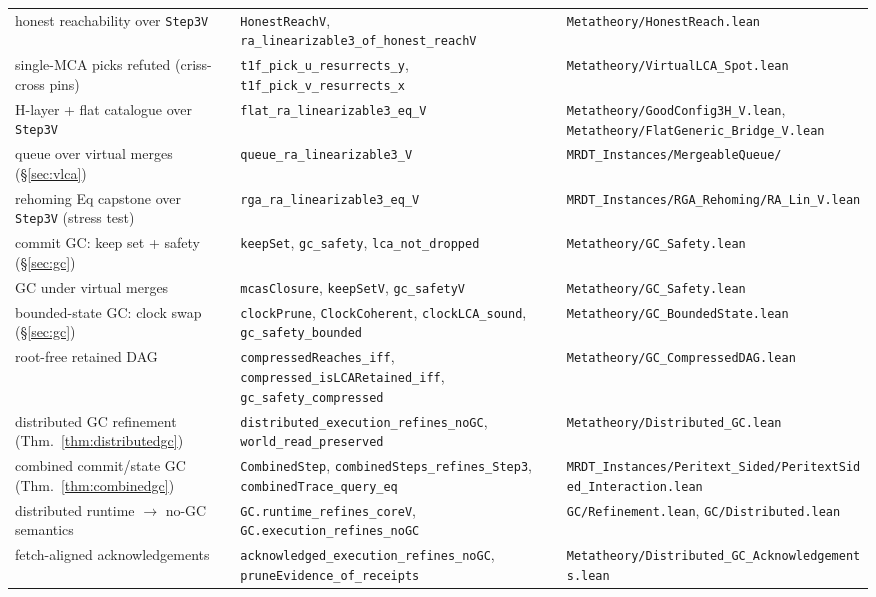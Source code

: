 \documentclass[11pt]{article}
\newcommand{\lean}[1]{\texttt{#1}}
\begin{document}
\begin{center}
{\begin{tabular}{@{}lll@{}}
honest reachability over \lean{Step3V} & \lean{HonestReachV}, \lean{ra\_linearizable3\_of\_honest\_reachV} & \lean{Metatheory/HonestReach.lean} \\
single-MCA picks refuted (criss-cross pins) & \lean{t1f\_pick\_u\_resurrects\_y}, \lean{t1f\_pick\_v\_resurrects\_x} & \lean{Metatheory/VirtualLCA\_Spot.lean} \\
H-layer + flat catalogue over \lean{Step3V} & \lean{flat\_ra\_linearizable3\_eq\_V} & \lean{Metatheory/GoodConfig3H\_V.lean}, \lean{Metatheory/FlatGeneric\_Bridge\_V.lean} \\
queue over virtual merges (\S\ref{sec:vlca}) & \lean{queue\_ra\_linearizable3\_V} & \lean{MRDT\_Instances/MergeableQueue/} \\
rehoming Eq capstone over \lean{Step3V} (stress test) & \lean{rga\_ra\_linearizable3\_eq\_V} & \lean{MRDT\_Instances/RGA\_Rehoming/RA\_Lin\_V.lean} \\
commit GC: keep set + safety (\S\ref{sec:gc}) & \lean{keepSet}, \lean{gc\_safety}, \lean{lca\_not\_dropped} & \lean{Metatheory/GC\_Safety.lean} \\
GC under virtual merges & \lean{mcasClosure}, \lean{keepSetV}, \lean{gc\_safetyV} & \lean{Metatheory/GC\_Safety.lean} \\
bounded-state GC: clock swap (\S\ref{sec:gc}) & \lean{clockPrune}, \lean{ClockCoherent}, \lean{clockLCA\_sound}, \lean{gc\_safety\_bounded} & \lean{Metatheory/GC\_BoundedState.lean} \\
root-free retained DAG & \lean{compressedReaches\_iff}, \lean{compressed\_isLCARetained\_iff}, \lean{gc\_safety\_compressed} & \lean{Metatheory/GC\_CompressedDAG.lean} \\
distributed GC refinement (Thm.~\ref{thm:distributedgc}) & \lean{distributed\_execution\_refines\_noGC}, \lean{world\_read\_preserved} & \lean{Metatheory/Distributed\_GC.lean} \\
combined commit/state GC (Thm.~\ref{thm:combinedgc}) & \lean{CombinedStep}, \lean{combinedSteps\_refines\_Step3}, \lean{combinedTrace\_query\_eq} & \lean{MRDT\_Instances/Peritext\_Sided/PeritextSided\_Interaction.lean} \\
distributed runtime $\to$ no-GC semantics & \lean{GC.runtime\_refines\_coreV}, \lean{GC.execution\_refines\_noGC} & \lean{GC/Refinement.lean}, \lean{GC/Distributed.lean} \\
fetch-aligned acknowledgements & \lean{acknowledged\_execution\_refines\_noGC}, \lean{pruneEvidence\_of\_receipts} & \lean{Metatheory/Distributed\_GC\_Acknowledgements.lean} \\

\end{tabular}}
\end{center}
\end{document}
